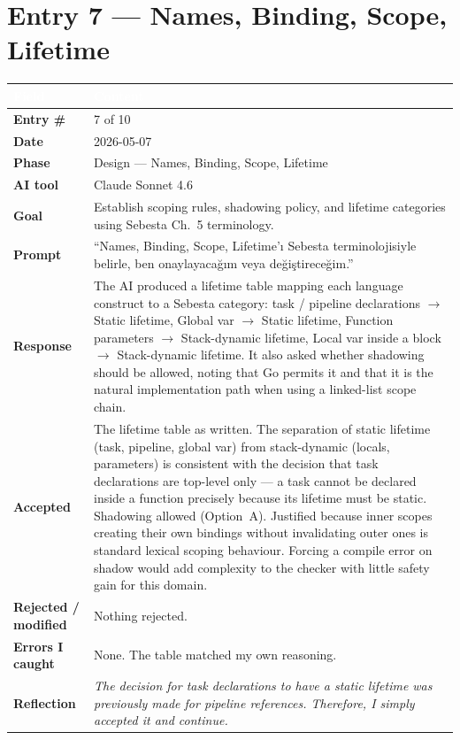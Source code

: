 \documentclass[a4paper,10pt]{article}
\begin{document}
\newpage

\section{Entry 7 --- Names, Binding, Scope, Lifetime}

\begin{tabular}{|
    >{\bfseries}m{3.5cm}|
    m{10cm}|
}
\hline
\rowcolor{headerblue}
\textcolor{white}{Field} & \textcolor{white}{\textbf{Content}} \\
\hline
\rowcolor{white}
Entry \#        & 7 of 10 \\
\hline
\rowcolor{altrow}
Date            & 2026-05-07 \\
\hline
\rowcolor{white}
Phase           & Design --- Names, Binding, Scope, Lifetime \\
\hline
\rowcolor{altrow}
AI tool         & Claude Sonnet 4.6  \\
\hline
\rowcolor{white}
Goal            & Establish scoping rules, shadowing policy, and lifetime categories using Sebesta Ch.~5 terminology. \\
\hline
\rowcolor{altrow}
Prompt          & ``Names, Binding, Scope, Lifetime'ı Sebesta terminolojisiyle belirle, ben onaylayacağım veya değiştireceğim.'' \\
\hline
\rowcolor{white}
Response  & The AI produced a lifetime table mapping each language construct to a Sebesta category: task / pipeline declarations $\rightarrow$ Static lifetime, Global var $\rightarrow$ Static lifetime, Function parameters $\rightarrow$ Stack-dynamic lifetime, Local var inside a block $\rightarrow$ Stack-dynamic lifetime. It also asked whether shadowing should be allowed, noting that Go permits it and that it is the natural implementation path when using a linked-list scope chain. \\
\hline
\rowcolor{altrow}
Accepted        & The lifetime table as written. The separation of static lifetime (task, pipeline, global var) from stack-dynamic (locals, parameters) is consistent with the decision that task declarations are top-level only --- a task cannot be declared inside a function precisely because its lifetime must be static. Shadowing allowed (Option~A). Justified because inner scopes creating their own bindings without invalidating outer ones is standard lexical scoping behaviour. Forcing a compile error on shadow would add complexity to the checker with little safety gain for this domain. \\
\hline
\rowcolor{white}
Rejected / modified & Nothing rejected. \\
\hline
\rowcolor{altrow}
Errors I caught   & None. The table matched my own reasoning. \\
\hline
\rowcolor{white}
Reflection  & \textit{The decision for task declarations to have a static lifetime was previously made for pipeline references. Therefore, I simply accepted it and continue.} 
\\
\hline
\end{tabular}
\end{document}
